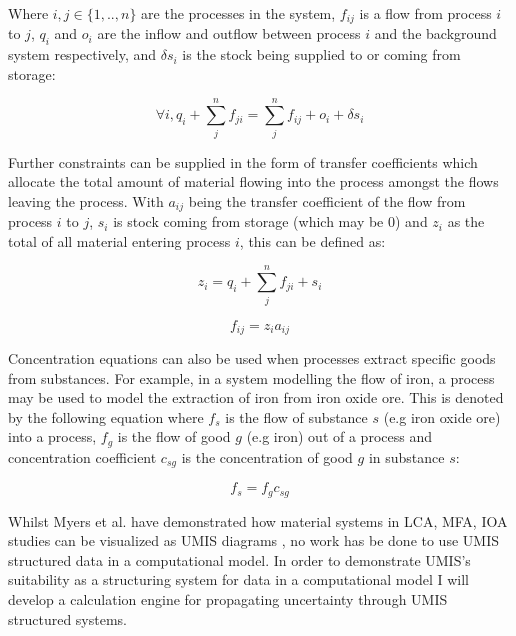 \documentclass[ %
                    author={Tom Jager},
                supervisor={Dr. Daniel Schien},
                    degree={MEng},
                     title={A Bayesian Inference Engine for UMIS Structured Data},
                  subtitle={},
                      type={research},
                      year={2019} ]{dissertation}
\begin{document}
Where $i,j \in \{1,..,n\} $ are the processes in the system, $f_{ij}$ is a flow from process $i$ to $j$, $q_i$ and $o_i$ are the inflow and outflow between process $i$ and the background system respectively, and $\delta s_i$ is the stock being supplied to or coming from storage:     

\begin{equation}
    \label{eq:mass_balance_1}
    \forall i, q_i + \sum^{n}_{j}f_{ji} = \sum^{n}_{j}f_{ij} + o_{i} + \delta s_i 
\end{equation}

Further constraints can be supplied in the form of transfer coefficients which allocate the total amount of material flowing into the process amongst the flows leaving the process. With $a_{ij}$ being the transfer coefficient of the flow from process $i$ to $j$, $s_i$ is stock coming from storage (which may be 0) and $z_i$ as the total of all material entering process $i$, this can be defined as:

\begin{equation}
    \label{eq:mass_balance_2}
    z_i = q_i + \sum^{n}_{j}f_{ji} + s_i
\end{equation}

\begin{equation}
    \label{eq:mass_balance_3}
    f_{ij} = z_{i}a_{ij}
\end{equation}

Concentration equations can also be used when processes extract specific goods from substances. For example, in a system modelling the flow of iron, a process may be used to model the extraction of iron from iron oxide ore. This is denoted by the following equation where $f_s$ is the flow of substance $s$ (e.g iron oxide ore) into a process, $f_g$ is the flow of good $g$ (e.g iron) out of a process and concentration coefficient $c_{sg}$ is the concentration of good $g$ in substance $s$:

\begin{equation}
    \label{eq:mass_balance_4}
    f_s = f_g c_{sg}
\end{equation}

Whilst Myers et al. have demonstrated how material systems in LCA, MFA, IOA studies can be visualized as UMIS diagrams \cite{myers2019unified}, no work has be done to use UMIS structured data in a computational model. In order to demonstrate UMIS's suitability as a structuring system for data in a computational model I will develop a calculation engine for propagating uncertainty through UMIS structured systems.
\end{document}
